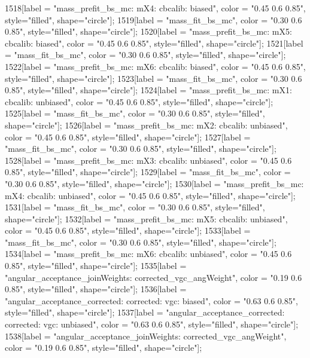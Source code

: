 {	1518[label = "mass_prefit_bs_mc\nmassbin: mX4\nmassmodel: cbcalib\ntrigger: biased", color = "0.45 0.6 0.85", style="filled", shape="circle"];
	1519[label = "mass_fit_bs_mc", color = "0.30 0.6 0.85", style="filled", shape="circle"];
	1520[label = "mass_prefit_bs_mc\nmassbin: mX5\nmassmodel: cbcalib\ntrigger: biased", color = "0.45 0.6 0.85", style="filled", shape="circle"];
	1521[label = "mass_fit_bs_mc", color = "0.30 0.6 0.85", style="filled", shape="circle"];
	1522[label = "mass_prefit_bs_mc\nmassbin: mX6\nmassmodel: cbcalib\ntrigger: biased", color = "0.45 0.6 0.85", style="filled", shape="circle"];
	1523[label = "mass_fit_bs_mc", color = "0.30 0.6 0.85", style="filled", shape="circle"];
	1524[label = "mass_prefit_bs_mc\nmassbin: mX1\nmassmodel: cbcalib\ntrigger: unbiased", color = "0.45 0.6 0.85", style="filled", shape="circle"];
	1525[label = "mass_fit_bs_mc", color = "0.30 0.6 0.85", style="filled", shape="circle"];
	1526[label = "mass_prefit_bs_mc\nmassbin: mX2\nmassmodel: cbcalib\ntrigger: unbiased", color = "0.45 0.6 0.85", style="filled", shape="circle"];
	1527[label = "mass_fit_bs_mc", color = "0.30 0.6 0.85", style="filled", shape="circle"];
	1528[label = "mass_prefit_bs_mc\nmassbin: mX3\nmassmodel: cbcalib\ntrigger: unbiased", color = "0.45 0.6 0.85", style="filled", shape="circle"];
	1529[label = "mass_fit_bs_mc", color = "0.30 0.6 0.85", style="filled", shape="circle"];
	1530[label = "mass_prefit_bs_mc\nmassbin: mX4\nmassmodel: cbcalib\ntrigger: unbiased", color = "0.45 0.6 0.85", style="filled", shape="circle"];
	1531[label = "mass_fit_bs_mc", color = "0.30 0.6 0.85", style="filled", shape="circle"];
	1532[label = "mass_prefit_bs_mc\nmassbin: mX5\nmassmodel: cbcalib\ntrigger: unbiased", color = "0.45 0.6 0.85", style="filled", shape="circle"];
	1533[label = "mass_fit_bs_mc", color = "0.30 0.6 0.85", style="filled", shape="circle"];
	1534[label = "mass_prefit_bs_mc\nmassbin: mX6\nmassmodel: cbcalib\ntrigger: unbiased", color = "0.45 0.6 0.85", style="filled", shape="circle"];
	1535[label = "angular_acceptance_joinWeights\nwflag: corrected_vgc_angWeight", color = "0.19 0.6 0.85", style="filled", shape="circle"];
	1536[label = "angular_acceptance_corrected\nangacc: corrected\ncsp: vgc\ntrigger: biased", color = "0.63 0.6 0.85", style="filled", shape="circle"];
	1537[label = "angular_acceptance_corrected\nangacc: corrected\ncsp: vgc\ntrigger: unbiased", color = "0.63 0.6 0.85", style="filled", shape="circle"];
	1538[label = "angular_acceptance_joinWeights\nwflag: corrected_vgc_angWeight", color = "0.19 0.6 0.85", style="filled", shape="circle"];
}
